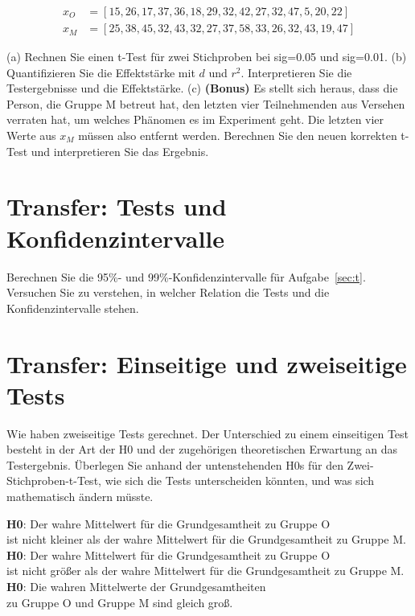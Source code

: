\begin{center}
  \begin{align}
    x_{O} &= [15, 26, 17, 37, 36, 18, 29, 32, 42, 27, 32, 47,  5, 20, 22]\\
    x_{M} &= [25, 38, 45, 32, 43, 32, 27, 37, 58, 33, 26, 32, 43, 19, 47]
  \end{align}
\end{center}

(a) Rechnen Sie einen t-Test für zwei Stichproben bei sig=0.05 und sig=0.01.
(b) Quantifizieren Sie die Effektstärke mit $d$ und $r^2$.
Interpretieren Sie die Testergebnisse und die Effektstärke.
(c) \textbf{(Bonus)} Es stellt sich heraus, dass die Person, die Gruppe M betreut hat, den letzten vier Teilnehmenden aus Versehen verraten hat, um welches Phänomen es im Experiment geht.
Die letzten vier Werte aus $x_M$ müssen also entfernt werden.
Berechnen Sie den neuen korrekten t-Test und interpretieren Sie das Ergebnis.

\section{Transfer: Tests und Konfidenzintervalle}

Berechnen Sie die 95\%- und 99\%-Konfidenzintervalle für Aufgabe~\ref{sec:t}.
Versuchen Sie zu verstehen, in welcher Relation die Tests und die Konfidenzintervalle stehen.

\section{Transfer: Einseitige und zweiseitige Tests}

Wie haben zweiseitige Tests gerechnet.
Der Unterschied zu einem einseitigen Test besteht in der Art der H0 und der zugehörigen theoretischen Erwartung an das Testergebnis.
Überlegen Sie anhand der untenstehenden H0s für den Zwei-Stichproben-t-Test, wie sich die Tests unterscheiden könnten, und was sich mathematisch ändern müsste.

\begin{center}
  \textbf{H0}: Der wahre Mittelwert für die Grundgesamtheit zu Gruppe O\\
  ist nicht kleiner als der wahre Mittelwert für die Grundgesamtheit zu Gruppe M.\\
  \Zeile
  \textbf{H0}: Der wahre Mittelwert für die Grundgesamtheit zu Gruppe O\\
  ist nicht größer als der wahre Mittelwert für die Grundgesamtheit zu Gruppe M.\\
  \Zeile
  \textbf{H0}: Die wahren Mittelwerte der Grundgesamtheiten\\
  zu Gruppe O und Gruppe M sind gleich groß.
\end{center}

